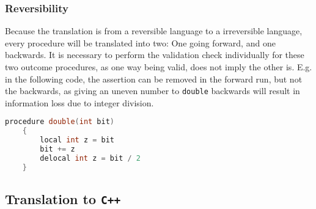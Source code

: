 \subsubsection*{Reversibility}
Because the translation is from a reversible language to a irreversible language, every procedure
will be translated into two: One going forward, and one backwards. It is necessary to perform
the validation check individually for these two outcome procedures, as one way being valid, does
not imply the other is. E.g. in the following code, the assertion can be removed in the
forward run, but not the backwards, as giving an uneven number to \texttt{double} backwards will
result in information loss due to integer division.

\begin{lstlisting}[language=C]
    procedure double(int bit)
    {
        local int z = bit
        bit += z
        delocal int z = bit / 2
    }
\end{lstlisting}



\subsection{Translation to \texttt{C++}}
